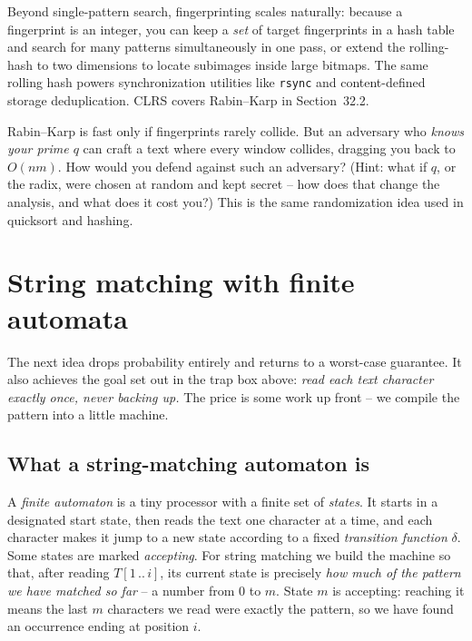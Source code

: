 \begin{focusbox}
Beyond single-pattern search, fingerprinting scales naturally: because a fingerprint is an integer, you can keep a \emph{set} of target fingerprints in a hash table
and search for many patterns simultaneously in one pass, or extend the rolling-hash
to two dimensions to locate subimages inside large bitmaps. The same rolling hash
powers synchronization utilities like \texttt{rsync} and content-defined storage deduplication.
CLRS covers Rabin--Karp in Section~32.2.
\end{focusbox}

\begin{walkbox}
Rabin--Karp is fast only if fingerprints rarely collide. But an adversary who \emph{knows your prime $q$} can
craft a text where every window collides, dragging you back to $O(nm)$. How would
you defend against such an adversary? (Hint: what if $q$, or the radix, were
chosen at random and kept secret -- how does that change the analysis, and what
does it cost you?) This is the same randomization idea used in quicksort and
hashing.
\end{walkbox}

\section{String matching with finite automata}
\label{ch31:automata}

The next idea drops probability entirely and returns to a worst-case guarantee.
It also achieves the goal set out in the trap box above: \emph{read each text
character exactly once, never backing up.} The price is some work up front -- we
compile the pattern into a little machine.

\subsection{What a string-matching automaton is}

A \emph{finite automaton} is a tiny processor with a finite set of \emph{states}.
It starts in a designated start state, then reads the text one character at a
time, and each character makes it jump to a new state according to a fixed
\emph{transition function} $\delta$. Some states are marked \emph{accepting}.
For string matching we build the machine so that, after reading $T[1\,..\,i]$,
its current state is precisely \emph{how much of the pattern we have matched so
far} -- a number from $0$ to $m$. State $m$ is accepting: reaching it means the
last $m$ characters we read were exactly the pattern, so we have found an
occurrence ending at position $i$.

